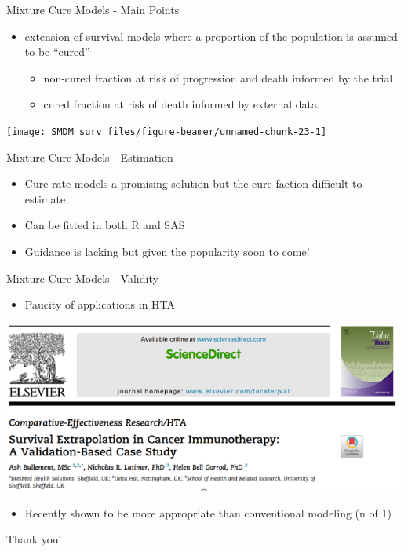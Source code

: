 \documentclass[ignorenonframetext,]{beamer}
\providecommand{\tightlist}{%
  \setlength{\itemsep}{0pt}\setlength{\parskip}{0pt}}
\begin{document}
\begin{frame}{Mixture Cure Models - Main Points}

\begin{itemize}
\tightlist
\item
  extension of survival models where a proportion of the population is
  assumed to be ``cured''

  \begin{itemize}
  \tightlist
  \item
    non-cured fraction at risk of progression and death informed by the
    trial
  \item
    cured fraction at risk of death informed by external data.
  \end{itemize}
\end{itemize}

\texttt{[image: SMDM\_surv\_files/figure-beamer/unnamed-chunk-23-1]}

\end{frame}

\begin{frame}{Mixture Cure Models - Estimation}

\begin{itemize}
\item
  Cure rate models a promising solution but the cure faction difficult
  to estimate
\item
  Can be fitted in both R and SAS
\item
  Guidance is lacking but given the popularity soon to come!
\end{itemize}

\end{frame}

\begin{frame}{Mixture Cure Models - Validity}

\begin{itemize}
\tightlist
\item
  Paucity of applications in HTA
\end{itemize}

\includegraphics[width=1\linewidth]{figures/latimercure}

\begin{itemize}
\tightlist
\item
  Recently shown to be more appropriate than conventional modeling (n of
  1)
\end{itemize}

\end{frame}

\begin{frame}{Thank you!}

\end{frame}
\end{document}
